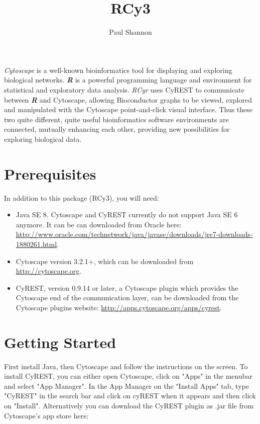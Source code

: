 \documentclass[12pt]{article}
\title{RCy3}
\author{Paul Shannon}
\begin{document}
\maketitle

\emph{Cytoscape} is a well-known bioinformatics tool for displaying and exploring biological networks.
\emph{\textbf{R}} is a powerful programming language and environment for statistical and exploratory data analysis.
\emph{RCyr} uses CyREST to communicate between \emph{\textbf{R}} and Cytoscape, allowing Bioconductor graphs to be
viewed, explored and manipulated with the Cytoscape point-and-click visual interface.  Thus these two quite different,
quite useful bioinformatics software environments are connected, mutually enhancing each other, providing new
possibilities for exploring biological data.

\section{Prerequisites}
In addition to this package (RCy3), you will need:

\begin{itemize}
  \item Java SE 8. Cytoscape and CyREST currently do not support Java SE 6 anymore. It can be can downloaded from Oracle here:
     \url{http://www.oracle.com/technetwork/java/javase/downloads/jre7-downloads-1880261.html}.
  \item Cytoscape version 3.2.1+, which can be downloaded from 
     \url{http://cytoscape.org}.
  \item CyREST, version 0.9.14 or later, a Cytoscape plugin which provides the Cytoscape end of the communication layer, can be downloaded from the Cytoscape plugins website:
     \url{http://apps.cytoscape.org/apps/cyrest}.
\end{itemize}


\section{Getting Started}

First install Java, then Cytoscape and follow the instructions on the screen. To install CyREST, you can either open Cytoscape, click on "Apps" in the menubar and select "App Manager". In the App Manager on the "Install Apps" tab, type "CyREST" in the search bar and click on cyREST when it appears and then click on "Install".
Alternatively you can download the CyREST plugin as .jar file from Cytoscape's app store here: \\
\end{document}
